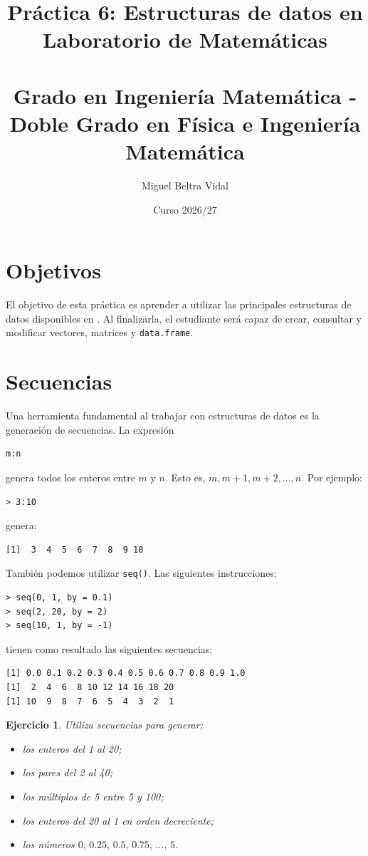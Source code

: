 \documentclass[11pt,a4paper]{article}
\title{\LARGE\textbf{Práctica 6: Estructuras de datos en \R}\\[0.5em]
\Large Laboratorio de Matemáticas\\
\small\ \\
\Large Grado en Ingeniería Matemática - Doble Grado en Física e Ingeniería Matemática}
\author{Miguel Beltra Vidal}
\date{Curso 2026/27}
\newcommand{\R}{\textcolor{azuluc}{\faIcon{r-project}}}
\theoremstyle{exercise}
\newtheorem{exercise}{Ejercicio}
\begin{document}
\maketitle



\section{Objetivos}

El objetivo de esta práctica es aprender a utilizar las principales estructuras de datos disponibles en \R. Al finalizarla, el estudiante será capaz de crear, consultar y modificar vectores, matrices y \texttt{data.frame}.






\section{Secuencias}

Una herramienta fundamental al trabajar con estructuras de datos es la generación de secuencias. La expresión
\begin{lstlisting}[style=rstyle]
m:n
\end{lstlisting}
genera todos los enteros entre $m$ y $n$. Esto es, $m,m+1,m+2,\ldots,n$. Por ejemplo:
\begin{lstlisting}[style=rconsole]
> 3:10
\end{lstlisting}
genera:
\begin{lstlisting}[style=routput]
[1]  3  4  5  6  7  8  9 10
\end{lstlisting}

También podemos utilizar \texttt{seq()}. Las siguientes instrucciones:
\begin{lstlisting}[style=rconsole]
> seq(0, 1, by = 0.1)
> seq(2, 20, by = 2)
> seq(10, 1, by = -1)
\end{lstlisting}
tienen como resultado las siguientes secuencias:
\begin{lstlisting}[style=routput]
[1] 0.0 0.1 0.2 0.3 0.4 0.5 0.6 0.7 0.8 0.9 1.0
[1]  2  4  6  8 10 12 14 16 18 20
[1] 10  9  8  7  6  5  4  3  2  1
\end{lstlisting}



\begin{exercise}
Utiliza secuencias para generar:
\begin{itemize}
	\item los enteros del 1 al 20;
	\item los pares del 2 al 40;
	\item los múltiplos de 5 entre 5 y 100;
	\item los enteros del 20 al 1 en orden decreciente;
	\item los números $0,\,0.25,\,0.5,\,0.75,\,\ldots,\,5$.
\end{itemize}
\end{exercise}
\end{document}
